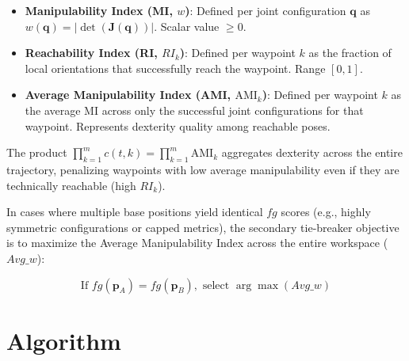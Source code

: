 \documentclass[a4paper,11pt]{article}
\begin{document}
\begin{itemize}
    \item \textbf{Manipulability Index (MI, $w$)}: Defined per joint configuration $\mathbf{q}$ as $w(\mathbf{q}) = |\det(\mathbf{J}(\mathbf{q}))|$. Scalar value $\ge 0$.
    \item \textbf{Reachability Index (RI, $RI_k$)}: Defined per waypoint $k$ as the fraction of local orientations that successfully reach the waypoint. Range $[0, 1]$.
    \item \textbf{Average Manipulability Index (AMI, $\text{AMI}_k$)}: Defined per waypoint $k$ as the average MI across only the successful joint configurations for that waypoint. Represents dexterity quality among reachable poses.
\end{itemize}

The product $\prod_{k=1}^{m} c(t, k) = \prod_{k=1}^{m} \text{AMI}_k$ aggregates dexterity across the entire trajectory, penalizing waypoints with low average manipulability even if they are technically reachable (high $RI_k$).

In cases where multiple base positions yield identical $fg$ scores (e.g., highly symmetric configurations or capped metrics), the secondary tie-breaker objective is to maximize the Average Manipulability Index across the entire workspace ($Avg\_w$):

\begin{equation}
    \text{If } fg(\mathbf{p}_A) = fg(\mathbf{p}_B), \text{ select } \arg\max (Avg\_w)
\end{equation}

\section{Algorithm}
\end{document}
